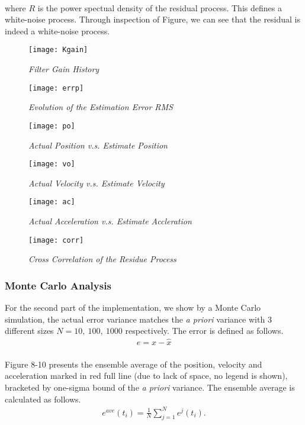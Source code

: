 \paragraph{}
where $R$ is the power spectual density of the residual process. This defines a white-noise process. Through inspection of Figure, we can see that the residual is indeed a white-noise process.
\begin{figure}[H]
	\centering
	\texttt{[image: Kgain]}
	\caption{\textit{Filter Gain History}}
\end{figure}
\begin{figure}[H]
	\centering
	\texttt{[image: errp]}
	\caption{\textit{Evolution of the Estimation Error RMS}}
\end{figure}
\begin{figure}[H]
	\centering
	\texttt{[image: po]}
	\caption{\textit{Actual Position v.s. Estimate Position}}
\end{figure}
\begin{figure}[H]
	\centering
	\texttt{[image: vo]}
	\caption{\textit{Actual Velocity v.s. Estimate Velocity}}
\end{figure}
\begin{figure}[H]
	\centering
	\texttt{[image: ac]}
	\caption{\textit{Actual Acceleration v.s. Estimate Accleration}}
\end{figure}
\begin{figure}[H]
	\centering
	\texttt{[image: corr]}
	\caption{\textit{Cross Correlation of the Residue Process}}
\end{figure}
\subsubsection{Monte Carlo Analysis}
For the second part of the implementation, we show by a Monte Carlo simulation, the actual error variance matches the \textit{a priori} variance with 3 different sizes $N = 10,\ 100,\ 1000$ respectively. The error is defined as follows.
\begin{align*}
e =x-  \hat{x} 
\end{align*}
\paragraph{}
Figure 8-10 presents the ensemble average of the position, velocity and acceleration marked in red full line (due to lack of space, no legend is shown), bracketed by one-sigma bound of the \textit{a priori} variance. The ensemble average is calculated as follows. 
\begin{align*}
e^{ave}(t_i) = \frac{1}{N}\sum^N_{j = 1}e^j(t_i).
\end{align*}
